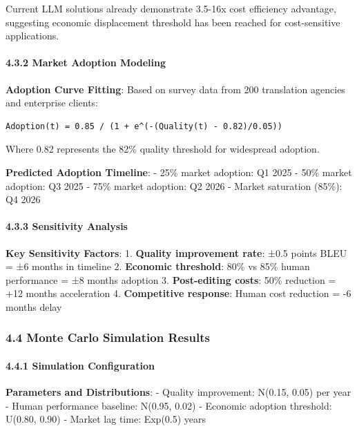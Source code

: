 \documentclass[12pt,a4paper]{article}
\begin{document}
{{{Current LLM solutions already demonstrate 3.5-16x cost efficiency
advantage, suggesting economic displacement threshold has been reached
for cost-sensitive applications.

\hypertarget{market-adoption-modeling}{%
\paragraph{4.3.2 Market Adoption
Modeling}\label{market-adoption-modeling}}

\textbf{Adoption Curve Fitting}: Based on survey data from 200
translation agencies and enterprise clients:

\begin{verbatim}
Adoption(t) = 0.85 / (1 + e^(-(Quality(t) - 0.82)/0.05))
\end{verbatim}

Where 0.82 represents the 82\% quality threshold for widespread
adoption.

\textbf{Predicted Adoption Timeline}: - 25\% market adoption: Q1 2025 -
50\% market adoption: Q3 2025 - 75\% market adoption: Q2 2026 - Market
saturation (85\%): Q4 2026

\hypertarget{sensitivity-analysis}{%
\paragraph{4.3.3 Sensitivity Analysis}\label{sensitivity-analysis}}

\textbf{Key Sensitivity Factors}: 1. \textbf{Quality improvement rate}:
±0.5 points BLEU = ±6 months in timeline 2. \textbf{Economic threshold}:
80\% vs 85\% human performance = ±8 months adoption 3.
\textbf{Post-editing costs}: 50\% reduction = +12 months acceleration 4.
\textbf{Competitive response}: Human cost reduction = -6 months delay

\hypertarget{monte-carlo-simulation-results}{%
\subsubsection{4.4 Monte Carlo Simulation
Results}\label{monte-carlo-simulation-results}}

\hypertarget{simulation-configuration}{%
\paragraph{4.4.1 Simulation
Configuration}\label{simulation-configuration}}

\textbf{Parameters and Distributions}: - Quality improvement: N(0.15,
0.05) per year - Human performance baseline: N(0.95, 0.02) - Economic
adoption threshold: U(0.80, 0.90) - Market lag time: Exp(0.5) years

}}}
\end{document}
